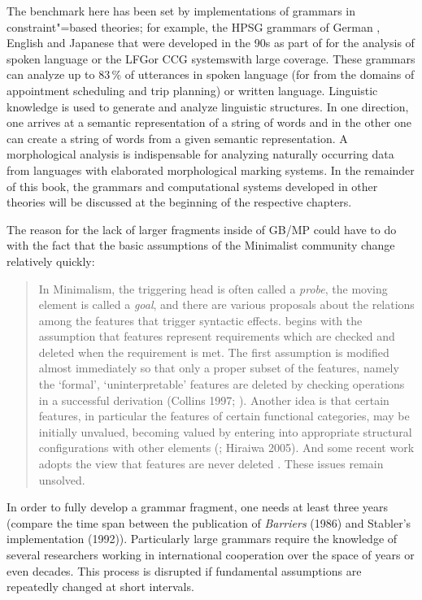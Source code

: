 The benchmark here has been set by implementations of grammars in constraint"=based theories; for example, the
HPSG grammars of German \citep{MK2000a}, English \citep*{FCS2000a} and
Japanese \citep{Siegel2000a} that were developed
in the 90s as part of \verbmobil \citep{Wahlster2000a-ed} for the analysis of spoken language  or
the LFG\indexlfg or CCG systems\indexccg with large coverage. These grammars can analyze up to 83\,\% of utterances in spoken language
(for \verbmobil from the domains of appointment scheduling and trip planning) or written language. Linguistic knowledge is used to generate and analyze 
linguistic structures. In one direction, one arrives at a semantic representation of a string of words and in the other one can create a string
of words from a given semantic representation. A morphological analysis is indispensable for analyzing naturally occurring data from languages with
elaborated morphological marking systems. In the remainder of this book, the grammars and computational systems developed in other theories will be discussed at the beginning of the
respective chapters.

The reason for the lack of larger fragments inside of GB/MP could have to do with the fact that the
basic assumptions of the Minimalist community change relatively quickly:
\begin{quote}
\label{Zitat-Stabler}
In Minimalism, the triggering head is often called a \emph{probe}, the moving element is called a
\emph{goal}, and there are various proposals about the relations among the features that trigger
syntactic effects. \citet[p.\,229]{Chomsky95a-u} begins with the assumption that features represent
requirements which are checked and deleted when the requirement is met. The first assumption is
modified almost immediately so that only a proper subset of the features, namely the `formal',
`uninterpretable' features are deleted by checking operations in a successful derivation (Collins
1997; \citealp[§4.5]{Chomsky95a-u}). Another idea is that certain features, in particular the
features of certain functional categories, may be initially unvalued, becoming valued by entering
into appropriate structural configurations with other elements (\citealp{Chomsky2008a}; Hiraiwa
2005). And some recent work adopts the view that features are never deleted
\citep[p.\,11]{Chomsky2007a}. These issues remain unsolved. \citep[]{Stabler2010a} 
\end{quote}
In order to fully develop a grammar fragment, one needs at least three years (compare the time span between the publication of \emph{Barriers} (1986)
and Stabler's implementation (1992)). Particularly large grammars require the knowledge of several researchers working in international cooperation
over the space of years or even decades. This process is disrupted if fundamental assumptions are repeatedly changed at short intervals.

